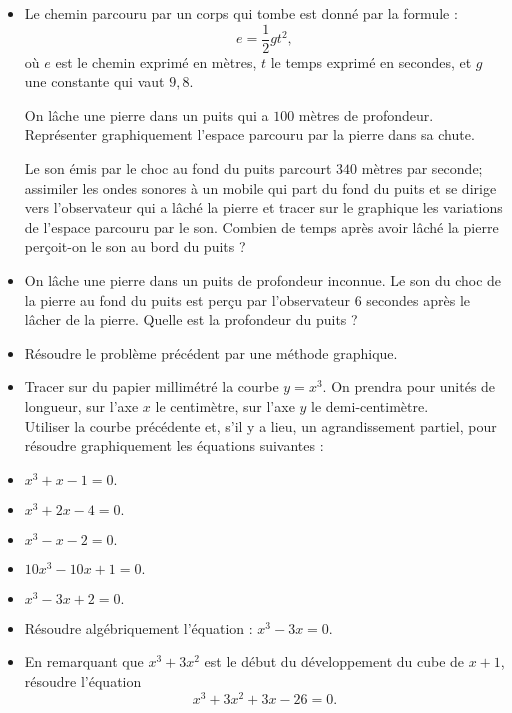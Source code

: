 \documentclass[12 pt]{report}
\theoremstyle{plain}
\newcounter{n}
\renewcommand{\it}{\item[$\mathbf{\then}.$]\stepcounter{n} }
\newenvironment{calcul}{\item[$\mathbf{\then}.$] \stepcounter{n}\hfil $\displaystyle  }{.$\hfil   }
\newcommand\intercalc{\end{calcul}\begin{calcul}}
\begin{document}
\begin{itemize}
\it Le chemin parcouru par un corps qui tombe est donné par la formule :
\[e=\frac12gt^2,\]
où $e$ est le chemin exprimé en mètres, $t$ le temps exprimé en secondes, et $g$ une constante qui vaut $9,8$. 

On lâche une pierre dans un puits qui a $100$ mètres de profondeur. Représenter graphiquement l'espace parcouru par la pierre dans sa chute. 

Le son émis par le choc au fond du puits parcourt $340$ mètres par seconde; assimiler les ondes sonores à un mobile qui part du fond du 
puits et se dirige vers l'observateur qui a lâché la pierre et tracer 
sur le graphique les variations de l'espace parcouru par le son. Combien de temps après avoir lâché la pierre perçoit-on le son au bord du puits ? 
\it On lâche une pierre dans un puits de profondeur inconnue. Le son du choc de la pierre au fond du puits est perçu par l'observateur $6$ secondes après le lâcher de la pierre. Quelle est la profondeur du puits ? 
\it Résoudre le problème précédent par une méthode graphique. 
\it Tracer sur du papier millimétré la courbe $y=x^3$. On prendra pour unités de longueur, sur l'axe $x$ le centimètre, sur l'axe $y$ le demi-centimètre.\\ Utiliser la courbe précédente et, s'il y a lieu, un agrandissement partiel, pour résoudre graphiquement les équations suivantes : 
\begin{calcul} x^3 + x -1 = 0 \intercalc
x^3+2x-4 = 0 \intercalc
x^3 - x -2 = 0 \intercalc
10x^3 - 10x+1 = 0 \intercalc 
x^3 - 3x+ 2 = 0 \end{calcul}
\it Résoudre algébriquement l'équation : $x^3-3x=0$. 
\it En remarquant que $x^3 + 3x^2$ est le début du développement du cube de $x+1$, résoudre l'équation \[ x^3 + 3x^2 + 3x - 26 = 0.\]

\end{itemize}
 
\end{document}
